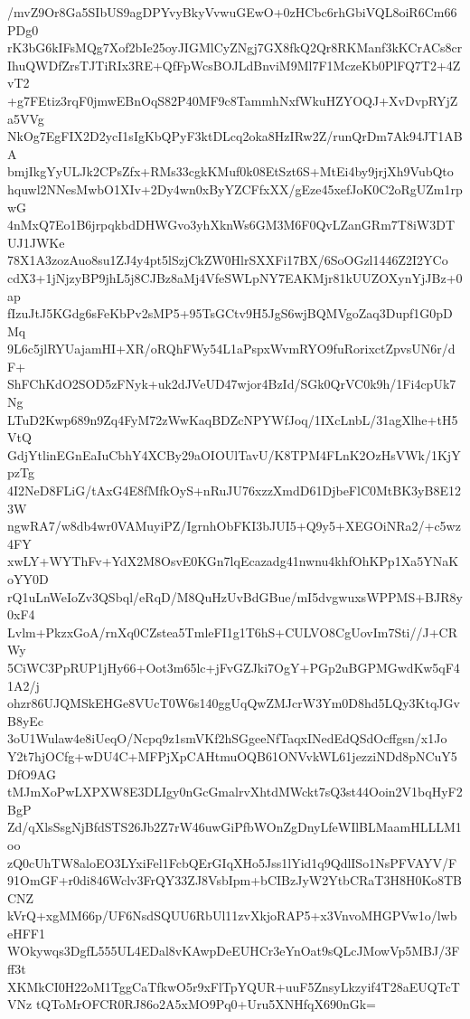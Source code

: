 /mvZ9Or8Ga5SIbUS9agDPYvyBkyVvwuGEwO+0zHCbc6rhGbiVQL8oiR6Cm66PDg0
rK3bG6kIFsMQg7Xof2bIe25oyJIGMlCyZNgj7GX8fkQ2Qr8RKManf3kKCrACs8cr
IhuQWDfZrsTJTiRIx3RE+QfFpWcsBOJLdBnviM9Ml7F1MczeKb0PlFQ7T2+4ZvT2
+g7FEtiz3rqF0jmwEBnOqS82P40MF9c8TammhNxfWkuHZYOQJ+XvDvpRYjZa5VVg
NkOg7EgFIX2D2ycI1sIgKbQPyF3ktDLcq2oka8HzIRw2Z/runQrDm7Ak94JT1ABA
bmjIkgYyULJk2CPsZfx+RMs33cgkKMuf0k08EtSzt6S+MtEi4by9jrjXh9VubQto
hquwl2NNesMwbO1XIv+2Dy4wn0xByYZCFfxXX/gEze45xefJoK0C2oRgUZm1rpwG
4nMxQ7Eo1B6jrpqkbdDHWGvo3yhXknWs6GM3M6F0QvLZanGRm7T8iW3DTUJ1JWKe
78X1A3zozAuo8su1ZJ4y4pt5lSzjCkZW0HlrSXXFi17BX/6SoOGzl1446Z2I2YCo
cdX3+1jNjzyBP9jhL5j8CJBz8aMj4VfeSWLpNY7EAKMjr81kUUZOXynYjJBz+0ap
fIzuJtJ5KGdg6sFeKbPv2sMP5+95TsGCtv9H5JgS6wjBQMVgoZaq3Dupf1G0pDMq
9L6c5jlRYUajamHI+XR/oRQhFWy54L1aPspxWvmRYO9fuRorixctZpvsUN6r/dF+
ShFChKdO2SOD5zFNyk+uk2dJVeUD47wjor4BzId/SGk0QrVC0k9h/1Fi4cpUk7Ng
LTuD2Kwp689n9Zq4FyM72zWwKaqBDZcNPYWfJoq/1IXcLnbL/31agXlhe+tH5VtQ
GdjYtlinEGnEaIuCbhY4XCBy29aOIOUlTavU/K8TPM4FLnK2OzHsVWk/1KjYpzTg
4I2NeD8FLiG/tAxG4E8fMfkOyS+nRuJU76xzzXmdD61DjbeFlC0MtBK3yB8E123W
ngwRA7/w8db4wr0VAMuyiPZ/IgrnhObFKI3bJUI5+Q9y5+XEGOiNRa2/+c5wz4FY
xwLY+WYThFv+YdX2M8OsvE0KGn7lqEcazadg41nwnu4khfOhKPp1Xa5YNaKoYY0D
rQ1uLnWeIoZv3QSbql/eRqD/M8QuHzUvBdGBue/mI5dvgwuxsWPPMS+BJR8y0xF4
Lvlm+PkzxGoA/rnXq0CZstea5TmleFI1g1T6hS+CULVO8CgUovIm7Sti//J+CRWy
5CiWC3PpRUP1jHy66+Oot3m65lc+jFvGZJki7OgY+PGp2uBGPMGwdKw5qF41A2/j
ohzr86UJQMSkEHGe8VUcT0W6s140ggUqQwZMJcrW3Ym0D8hd5LQy3KtqJGvB8yEc
3oU1Wulaw4e8iUeqO/Ncpq9z1smVKf2hSGgeeNfTaqxINedEdQSdOcffgsn/x1Jo
Y2t7hjOCfg+wDU4C+MFPjXpCAHtmuOQB61ONVvkWL61jezziNDd8pNCuY5DfO9AG
tMJmXoPwLXPXW8E3DLIgy0nGcGmalrvXhtdMWckt7sQ3st44Ooin2V1bqHyF2BgP
Zd/qXlsSsgNjBfdSTS26Jb2Z7rW46uwGiPfbWOnZgDnyLfeWIlBLMaamHLLLM1oo
zQ0cUhTW8aloEO3LYxiFel1FcbQErGIqXHo5Jss1lYid1q9QdlISo1NsPFVAYV/F
91OmGF+r0di846Wclv3FrQY33ZJ8VsbIpm+bCIBzJyW2YtbCRaT3H8H0Ko8TBCNZ
kVrQ+xgMM66p/UF6NsdSQUU6RbUl11zvXkjoRAP5+x3VnvoMHGPVw1o/lwbeHFF1
WOkywqs3DgfL555UL4EDal8vKAwpDeEUHCr3eYnOat9sQLcJMowVp5MBJ/3Fff3t
XKMkCI0H22oM1TggCaTfkwO5r9xFlTpYQUR+uuF5ZnsyLkzyif4T28aEUQTcTVNz
tQToMrOFCR0RJ86o2A5xMO9Pq0+Uru5XNHfqX690nGk=
